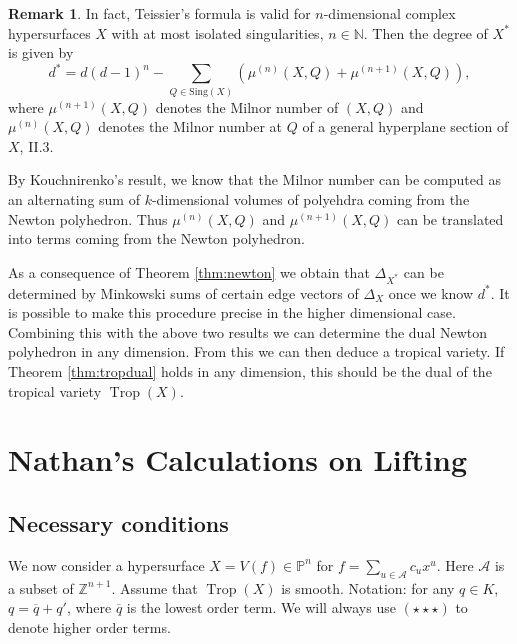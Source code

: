 \documentclass[oneside]{amsart}
\newcommand{\A}{\mathcal{A}}
\newcommand{\ZZ}{\mathbb{Z}}
\newcommand{\PP}{\mathbb{P}}
\newcommand{\NN}{\mathbb{N}}
\newcommand{\HOT}{(\star\star\star)}
\DeclareMathOperator{\trop}{Trop}
\theoremstyle{definition}
\newtheorem{rem}[thm]{Remark}
\newcommand{\bernd}[1]{\textcolor{green!60!black}{#1}}
\begin{document}
\begin{rem} 
In fact, Teissier's formula is valid for $ n $-dimensional complex
hypersurfaces $ X $ with at most isolated singularities, $ n \in \NN$.
Then the degree of $ X^* $ is given by
$$	
	d^* = d (d-1)^n - \sum_{Q \in \mathrm{Sing} (X)} ( \mu^{(n)} (X,Q) + \mu^{(n+1)}(X,Q)) ,
$$
where $ \mu^{(n+1)}(X,Q) $ denotes the Milnor number of $ (X,Q) $ and
$ \mu^{(n)}(X,Q) $ denotes the Milnor number at $ Q $ of a general hyperplane
section of $ X $, \cite{LNM777} II.3.

By Kouchnirenko's result, we know that the Milnor number can be computed as
an alternating sum of $ k $-dimensional volumes of polyehdra  coming from the
Newton polyhedron. 
Thus $ \mu^{(n)} (X,Q) $ and $ \mu^{(n+1)}(X,Q) $ can be translated into terms 
coming from the Newton polyhedron. 

\bernd{As a consequence of Theorem \ref{thm:newton} we obtain that 
$ \Delta_{X^*} $ can be determined by Minkowski sums of certain edge vectors 
of $ \Delta_X $ once we know $ d^* $.
It is possible to make this procedure precise in the higher dimensional case.
Combining this with the above two results we can determine the dual Newton polyhedron
in any dimension. 
From this we can then deduce a tropical variety.
If Theorem \ref{thm:tropdual} holds in any dimension, this should be the dual 
of the tropical variety $ \trop (X) $.
}
\end{rem} 



\section{Nathan's Calculations on Lifting}
\subsection{Necessary conditions}
We now consider a hypersurface $X=V(f)\in\PP^n$ for $f=\sum_{u\in\A} c_u x^u$. Here $\A$ is a subset of $\ZZ^{n+1}$. Assume that $\trop(X)$ is smooth.
Notation: for any $q\in K$, $q=\overline q+q'$, where $\overline q$ is the lowest order term. We will always use $\HOT$ to denote higher order terms.
\end{document}
